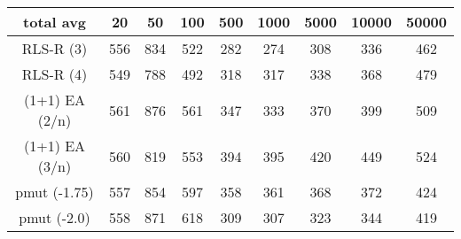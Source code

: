 \begin{tabular}[h]{ccccccccc}
total avg&20&50&100&500&1000&5000&10000&50000\\\hline
RLS-R (3)&556&834&522&282&274&308&336&462\\
RLS-R (4)&549&788&492&318&317&338&368&479\\
(1+1) EA (2/n)&561&876&561&347&333&370&399&509\\
(1+1) EA (3/n)&560&819&553&394&395&420&449&524\\
pmut (-1.75)&557&854&597&358&361&368&372&424\\
pmut (-2.0)&558&871&618&309&307&323&344&419\\
\end{tabular}

